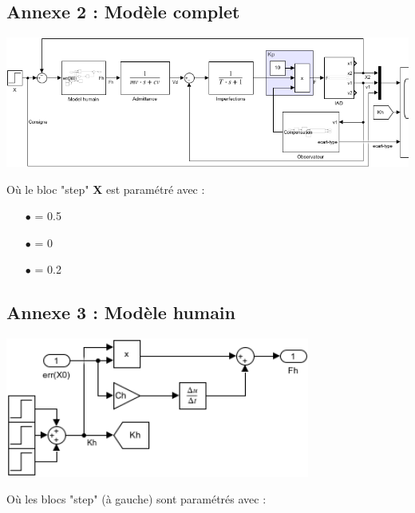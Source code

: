 \documentclass[a4paper,12pt]{article}
\begin{document}
    \subsection{Annexe 2 : Modèle complet} \label{Annexe:modelComplet}
    \begin{center}
        \includegraphics[width=16cm]{./img/model_complet.png}
    \end{center}
    Où le bloc "step" \textbf{X} est paramétré avec : 
    \begin{itemize}
        \item[$\bullet$]  = 0.5
        \item[$\bullet$]  = 0
        \item[$\bullet$]  = 0.2
    \end{itemize}


    \subsection{Annexe 3 : Modèle humain} \label{Annexe:modelHumain}
    \begin{center}
        \includegraphics[width=10cm]{./img/model_humain.png}
    \end{center}
    Où les blocs "step" (à gauche) sont paramétrés avec :
    
\end{document}
